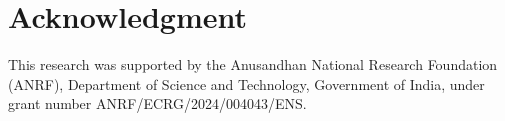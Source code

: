 \documentclass[conference]{IEEEtran}
\begin{document}
\section*{Acknowledgment}
This research was supported by the Anusandhan National Research Foundation (ANRF), Department of Science and Technology, Government of India, under grant number ANRF/ECRG/2024/004043/ENS.



\end{document}
